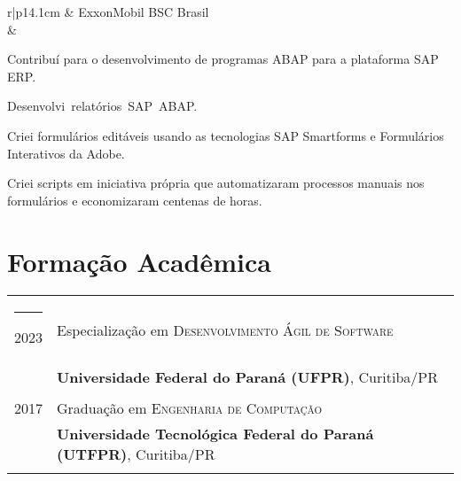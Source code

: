 \documentclass[a4paper,12pt]{article}
\begin{document}
\begin{tabular}{r|p{14.1cm}}
& ExxonMobil BSC Brasil\\
&\footnotesize{
    \begin{itemize*}[label=\Large\textbullet]
        \item Contribuí para o desenvolvimento de programas ABAP para a plataforma SAP ERP.
        \item \mbox{Desenvolvi relatórios SAP ABAP.}
        \item Criei formulários editáveis usando as tecnologias SAP Smartforms e Formulários Interativos da Adobe.
        \item Criei scripts em iniciativa própria que \mbox{automatizaram} processos manuais nos formulários e economizaram centenas de horas.
    \end{itemize*}
}
\end{tabular}
\section{Formação Acadêmica}
\begin{tabular}{rl}
\rule{3.2cm}{0pt} 2023 & Especialização em \textsc{Desenvolvimento Ágil de Software} \\ &\normalsize\textbf{Universidade Federal do Paraná (UFPR)}, Curitiba/PR\\&\\
2017 & Graduação em \textsc{Engenharia de Computação} \\ &\normalsize\textbf{Universidade Tecnológica Federal do Paraná (UTFPR)}, Curitiba/PR\\&\\
\end{tabular}

\end{document}
